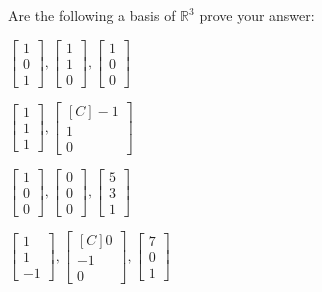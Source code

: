 \begin{exercise}
Are the following a basis of $\mathbb{R}^3$ prove your answer:\\
\begin{inparaenum}[a)]
\item $\begin{bmatrix}1 \\ 0 \\ 1\end{bmatrix}, \begin{bmatrix}1 \\ 1 \\ 0\end{bmatrix}, \begin{bmatrix}1 \\ 0 \\ 0 \end{bmatrix}$ \hfill 
\item $\begin{bmatrix}1 \\ 1 \\ 1\end{bmatrix}, \begin{bmatrix*}[C]-1 \\ 1\\ 0\end{bmatrix*}$ \hfill {} \\
\item $\begin{bmatrix}1 \\ 0 \\ 0\end{bmatrix}, \begin{bmatrix}0 \\ 0 \\ 0\end{bmatrix}, \begin{bmatrix}5 \\ 3\\ 1\end{bmatrix}$ \hfill 
\item $\begin{bmatrix}1 \\ 1 \\ -1\end{bmatrix}, \begin{bmatrix*}[C]0 \\ -1 \\ 0\end{bmatrix*}, \begin{bmatrix}7 \\ 0 \\ 1\end{bmatrix}$ \hfill {} \\

\end{inparaenum}
\end{exercise}
